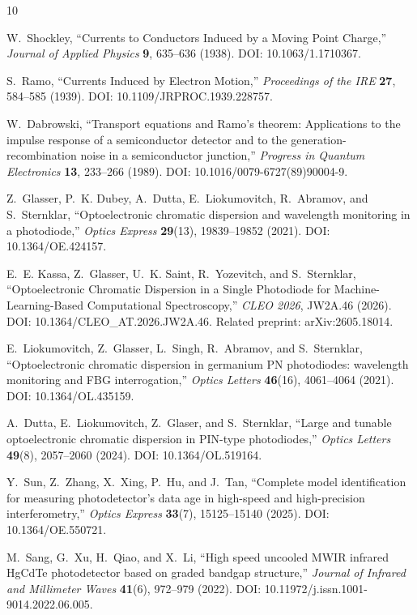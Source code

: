 \documentclass[11pt]{article}
\begin{document}
\begin{thebibliography}{10}

W.~Shockley, ``Currents to Conductors Induced by a Moving Point Charge,'' \emph{Journal of Applied Physics} \textbf{9}, 635--636 (1938). DOI: 10.1063/1.1710367.

S.~Ramo, ``Currents Induced by Electron Motion,'' \emph{Proceedings of the IRE} \textbf{27}, 584--585 (1939). DOI: 10.1109/JRPROC.1939.228757.

W.~Dabrowski, ``Transport equations and Ramo's theorem: Applications to the impulse response of a semiconductor detector and to the generation-recombination noise in a semiconductor junction,'' \emph{Progress in Quantum Electronics} \textbf{13}, 233--266 (1989). DOI: 10.1016/0079-6727(89)90004-9.

Z.~Glasser, P.~K. Dubey, A.~Dutta, E.~Liokumovitch, R.~Abramov, and S.~Sternklar, ``Optoelectronic chromatic dispersion and wavelength monitoring in a photodiode,'' \emph{Optics Express} \textbf{29}(13), 19839--19852 (2021). DOI: 10.1364/OE.424157.

E.~E. Kassa, Z.~Glasser, U.~K. Saint, R.~Yozevitch, and S.~Sternklar, ``Optoelectronic Chromatic Dispersion in a Single Photodiode for Machine-Learning-Based Computational Spectroscopy,'' \emph{CLEO 2026}, JW2A.46 (2026). DOI: 10.1364/CLEO\_AT.2026.JW2A.46. Related preprint: arXiv:2605.18014.

E.~Liokumovitch, Z.~Glasser, L.~Singh, R.~Abramov, and S.~Sternklar, ``Optoelectronic chromatic dispersion in germanium PN photodiodes: wavelength monitoring and FBG interrogation,'' \emph{Optics Letters} \textbf{46}(16), 4061--4064 (2021). DOI: 10.1364/OL.435159.

A.~Dutta, E.~Liokumovitch, Z.~Glaser, and S.~Sternklar, ``Large and tunable optoelectronic chromatic dispersion in PIN-type photodiodes,'' \emph{Optics Letters} \textbf{49}(8), 2057--2060 (2024). DOI: 10.1364/OL.519164.

Y.~Sun, Z.~Zhang, X.~Xing, P.~Hu, and J.~Tan, ``Complete model identification for measuring photodetector's data age in high-speed and high-precision interferometry,'' \emph{Optics Express} \textbf{33}(7), 15125--15140 (2025). DOI: 10.1364/OE.550721.

M.~Sang, G.~Xu, H.~Qiao, and X.~Li, ``High speed uncooled MWIR infrared HgCdTe photodetector based on graded bandgap structure,'' \emph{Journal of Infrared and Millimeter Waves} \textbf{41}(6), 972--979 (2022). DOI: 10.11972/j.issn.1001-9014.2022.06.005.


\end{thebibliography}
\end{document}
